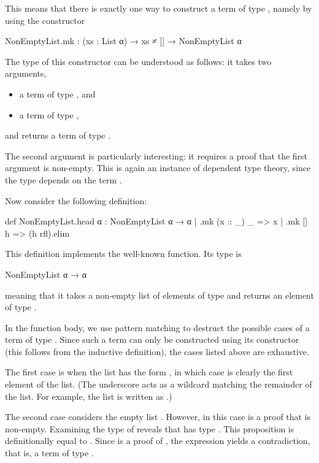 This means that there is exactly one way to construct a term of type ,
namely by using the constructor

\begin{leanblock}
NonEmptyList.mk : (xs : List α) → xs ≠ [] → NonEmptyList α
\end{leanblock}

The type of this constructor can be understood as follows: it takes two arguments,
\begin{itemize}[noitemsep]
\item a term  of type , and
\item a term of type ,
\end{itemize}
and returns a term of type .

The second argument is particularly interesting: it requires a proof that the first argument
 is non-empty. This is again an instance of dependent type theory, since the type
 depends on the term .

\bigskip

Now consider the following definition:

\begin{leanblock}
def NonEmptyList.head {α} : NonEmptyList α → α
| .mk (x :: _) _ => x
| .mk [] h => (h rfl).elim
\end{leanblock}

This definition implements the well-known  function. Its type is

\begin{leanblock}
NonEmptyList α → α
\end{leanblock}

meaning that it takes a non-empty list of elements of type  and returns an element of
type .

In the function body, we use pattern matching to destruct the possible cases of a term of type .
Since such a term can only be constructed using its constructor
(this follows from the inductive definition), the cases listed above are exhaustive.

The first case is when the list has the form , in which case  is clearly the first
element of the list. (The underscore \lean{_} acts as a wildcard matching the remainder of the
list. For example, the list \lean{[1,2,3]} is written as .)

The second case considers the empty list \lean{[]}. However, in this case  is a proof
that \lean{[]} is non-empty. Examining the type of  reveals that  has
type . This proposition is definitionally equal to .
Since  is a proof of \lean{[] = []}, the expression  yields a contradiction, that is, a
term of type .

